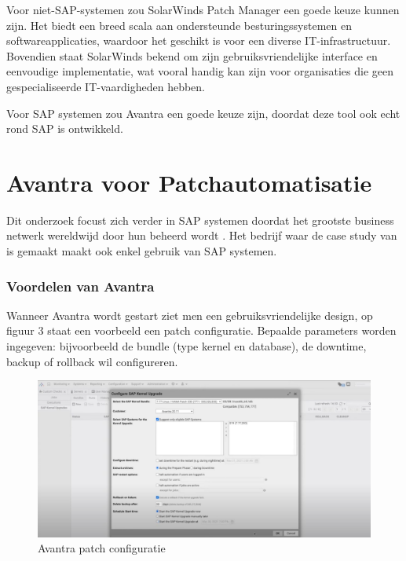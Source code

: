  Voor niet-SAP-systemen zou SolarWinds Patch Manager een goede keuze kunnen zijn. Het biedt een breed scala aan ondersteunde besturingssystemen en softwareapplicaties, waardoor het geschikt is voor
  een diverse IT-infrastructuur. Bovendien staat SolarWinds bekend om zijn gebruiksvriendelijke interface en eenvoudige implementatie, wat vooral handig kan zijn voor organisaties die geen gespecialiseerde IT-vaardigheden hebben.
 
Voor SAP systemen zou Avantra een goede keuze zijn, doordat deze tool ook echt rond SAP is ontwikkeld. \\

\section{Avantra voor Patchautomatisatie}

Dit onderzoek focust zich verder in SAP systemen doordat het grootste business netwerk wereldwijd door hun beheerd wordt \autocite{Laborde2024}. Het bedrijf waar de case study van is gemaakt maakt ook enkel gebruik van SAP systemen.

\subsubsection{Voordelen van Avantra}

Wanneer Avantra wordt gestart ziet men een gebruiksvriendelijke design, op figuur 3 staat een voorbeeld een patch configuratie. Bepaalde parameters worden ingegeven: bijvoorbeeld de bundle (type kernel en database), de downtime, backup of 
 rollback wil configureren. \\ 

\begin{figure}[htbp]
    \centering
    \includegraphics[width=\textwidth]{avantra1.png}
    \caption{Avantra patch configuratie}
     \label{fig:avantra1}
\end{figure}

